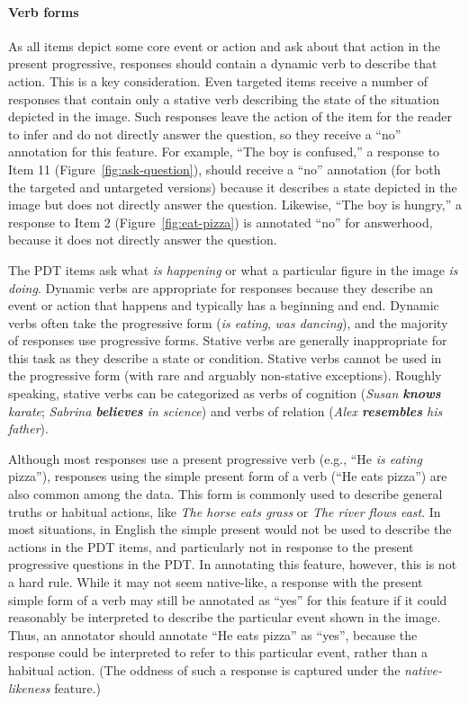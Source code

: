 \documentclass[12pt,notitlepage]{article}
\begin{document}
\paragraph{Verb forms} As all items depict some core event or action and ask about that action in the present progressive, responses should contain a dynamic verb to describe that action. This is a key consideration. Even targeted items receive a number of responses that contain only a stative verb describing the state of the situation depicted in the image. Such responses leave the action of the item for the reader to infer and do not directly answer the question, so they receive a ``no'' annotation for this feature. For example, ``The boy is confused,'' a response to Item 11 (Figure~\ref{fig:ask-question}), should receive a ``no'' annotation (for both the targeted and untargeted versions) because it describes a state depicted in the image but does not directly answer the question. Likewise, ``The boy is hungry,'' a response to Item 2 (Figure~\ref{fig:eat-pizza}) is annotated ``no'' for answerhood, because it does not directly answer the question. 

The PDT items ask what \textit{is happening} or what a particular figure in the image \textit{is doing}. Dynamic verbs are appropriate for responses because they describe an event or action that happens and typically has a beginning and end. Dynamic verbs often take the progressive form (\textit{is eating}, \textit{was dancing}), and the majority of responses use progressive forms. Stative verbs are generally inappropriate for this task as they describe a state or condition. Stative verbs cannot be used in the progressive form (with rare and arguably non-stative exceptions). Roughly speaking, stative verbs can be categorized as verbs of cognition (\textit{Susan \textbf{knows} karate}; \textit{Sabrina \textbf{believes} in science}) and verbs of relation (\textit{Alex \textbf{resembles} his father}).

Although most responses use a present progressive  verb (e.g., ``He \textit{is eating} pizza''), responses using the simple present form of a verb (``He eats pizza'') are also common among the data. This form is commonly used to describe general truths or habitual actions, like \textit{The horse eats grass} or \textit{The river flows east}. In most situations, in English the simple present would not be used to describe the actions in the PDT items, and particularly not in response to the present progressive questions in the PDT. In annotating this feature, however, this is not a hard rule. While it may not seem native-like, a response with the present simple form of a verb may still be annotated as ``yes'' for this feature if it could reasonably be interpreted to describe the particular event shown in the image. Thus, an annotator should annotate ``He eats pizza'' as ``yes'', because the response could be interpreted to refer to this particular event, rather than a habitual action. (The oddness of such a response is captured under the \textit{native-likeness} feature.)
\end{document}
